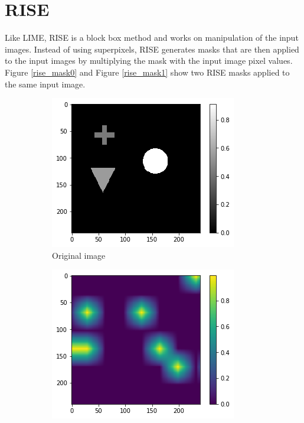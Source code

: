 \section{RISE}
Like LIME, RISE\cite{Petsiuk2018rise} is a block box method and works on manipulation of the input images. Instead of using superpixels, RISE generates masks that are then applied to the input images by multiplying the mask with the input image pixel values. Figure \ref{rise_mask0} and Figure \ref{rise_mask1} show two RISE masks applied to the same input image.

\begin{figure}[H]
    \centering
    \begin{subfigure}[t]{.32\textwidth}
        \centering
        \includegraphics[width=\linewidth]{chapters/02_methods/images/rise/rise_original.png}
        \caption{Original image}
    \end{subfigure}\hfill%
    \begin{subfigure}[t]{.32\textwidth}
        \centering
        \includegraphics[width=\linewidth]{chapters/02_methods/images/rise/rise0_mask.png}

\end{subfigure}
\end{figure}
